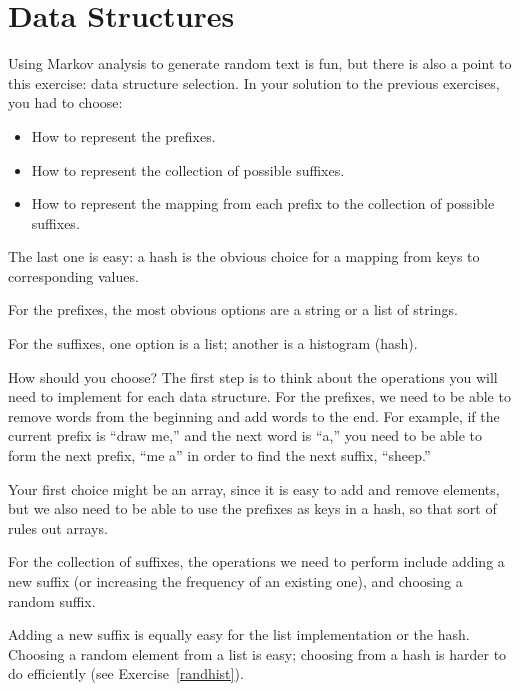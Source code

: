 \section{Data Structures}

Using Markov analysis to generate random text is fun, but there is
also a point to this exercise: data structure selection.  In your
solution to the previous exercises, you had to choose:

\begin{itemize}

\item How to represent the prefixes.

\item How to represent the collection of possible suffixes.

\item How to represent the mapping from each prefix to
the collection of possible suffixes.

\end{itemize}

The last one is easy: a hash is the obvious choice
for a mapping from keys to corresponding values.

For the prefixes, the most obvious options are a string or
a list of strings.

For the suffixes,
one option is a list; another is a histogram (hash).

How should you choose?  The first step is to think about
the operations you will need to implement for each data structure.
For the prefixes, we need to be able to remove words from
the beginning and add words to the end.  For example, if the current
prefix is ``draw me,'' and the next word is ``a,'' you need
to be able to form the next prefix, ``me a'' in order to find 
the next suffix, ``sheep.''

Your first choice might be an array, since it is easy to add
and remove elements, but we also need to be able to use the
prefixes as keys in a hash, so that sort of rules out arrays.

For the collection of suffixes, the operations we need to
perform include adding a new suffix (or increasing the frequency
of an existing one), and choosing a random suffix.

Adding a new suffix is equally easy for the list implementation
or the hash.  Choosing a random element from a list
is easy; choosing from a hash is harder to do
efficiently (see Exercise~\ref{randhist}).

